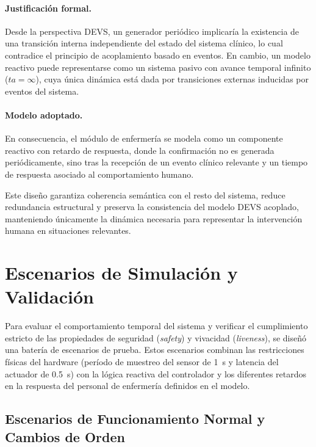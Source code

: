 \documentclass[11pt,a4paper]{article}
\begin{document}
\paragraph{Justificación formal.}
Desde la perspectiva DEVS, un generador periódico implicaría la existencia de una transición interna independiente del estado del sistema clínico, lo cual contradice el principio de acoplamiento basado en eventos. En cambio, un modelo reactivo puede representarse como un sistema pasivo con avance temporal infinito ($ta = \infty$), cuya única dinámica está dada por transiciones externas inducidas por eventos del sistema.

\paragraph{Modelo adoptado.}
En consecuencia, el módulo de enfermería se modela como un componente reactivo con retardo de respuesta, donde la confirmación no es generada periódicamente, sino tras la recepción de un evento clínico relevante y un tiempo de respuesta asociado al comportamiento humano.

Este diseño garantiza coherencia semántica con el resto del sistema, reduce redundancia estructural y preserva la consistencia del modelo DEVS acoplado, manteniendo únicamente la dinámica necesaria para representar la intervención humana en situaciones relevantes. 


\section{Escenarios de Simulación y Validación}

Para evaluar el comportamiento temporal del sistema y verificar el cumplimiento estricto de las propiedades de seguridad (\textit{safety}) y vivacidad (\textit{liveness}), se diseñó una batería de escenarios de prueba. Estos escenarios combinan las restricciones físicas del hardware (período de muestreo del sensor de \SI{1}{\second} y latencia del actuador de \SI{0.5}{\second}) con la lógica reactiva del controlador y los diferentes retardos en la respuesta del personal de enfermería definidos en el modelo.

\subsection{Escenarios de Funcionamiento Normal y Cambios de Orden}
\end{document}

